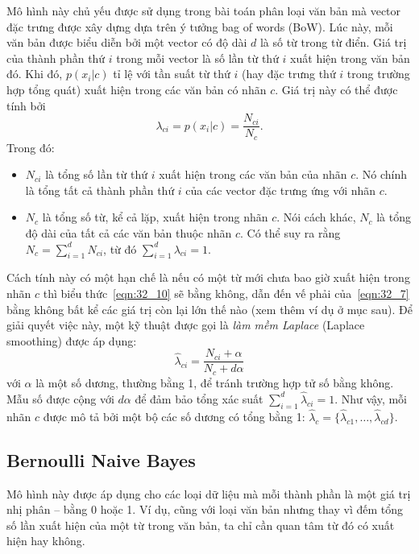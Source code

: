 Mô hình này chủ yếu được sử dụng trong bài toán phân loại văn bản mà vector đặc
trưng được xây dựng dựa trên ý tưởng bag of words (BoW). Lúc này, mỗi văn bản
được biểu diễn bởi một vector có độ dài $d$ là số từ trong từ điển. Giá trị của
thành phần thứ $i$ trong mỗi vector là số lần từ thứ $i$ xuất hiện trong văn bản
đó. Khi đó, $p(x_i |c) $ tỉ lệ với tần suất từ thứ $i$ (hay đặc trưng thứ $i$
trong trường hợp tổng quát) xuất hiện trong các văn bản có nhãn $c$. Giá trị này
có thể được tính bởi
\begin{equation}
\label{eqn:32_10}
\lambda_{ci} = p(x_i | c) = \frac{N_{ci}}{N_c}.
\end{equation}
Trong đó:
\begin{itemize}
\item $N_{ci}$ là tổng số lần từ thứ $i$ xuất hiện trong các văn bản của
nhãn $c$. Nó chính là tổng tất cả thành phần thứ $i$ của các
vector đặc trưng ứng với nhãn $c$.

\item $N_c$ là tổng số từ, kể cả lặp, xuất hiện trong nhãn $c$. Nói cách
khác, $N_c$ là tổng độ dài của tất cả các văn bản thuộc nhãn $c$. Có
thể suy ra rằng $N_c = \sum_{i = 1}^d N_{ci}$, từ đó $\sum_{i=1}^d
\lambda_{ci} = 1$.
\end{itemize}

Cách tính này có một hạn chế là nếu có một từ mới chưa bao giờ xuất hiện trong
nhãn $c$ thì biểu thức~\eqref{eqn:32_10} sẽ bằng không, dẫn đến vế phải
của~\eqref{eqn:32_7} bằng không bất kể các giá trị còn lại lớn thế nào (xem
thêm ví dụ ở mục sau). Để giải quyết việc này, một kỹ thuật được gọi là
\textit{làm mềm Laplace} (Laplace smoothing) được áp dụng:
\begin{equation}
\label{eqn:32_11}
\hat{\lambda}_{ci} = \frac{N_{ci} + \alpha}{N_{c} + d\alpha}
\end{equation}
với $\alpha$ là một số dương, thường bằng 1, để tránh trường hợp tử số bằng
không. Mẫu số được cộng với $d\alpha$ để đảm bảo tổng xác suất $\sum_{i=1}^d
\hat{\lambda}_{ci} = 1$.
Như vậy, mỗi nhãn $c$ được mô tả bởi một bộ các số dương có tổng bằng 1: $\hat{\lambda}_c = \{\hat{\lambda}_{c1}, \dots, \hat{\lambda}_{cd}\}$.


\subsection{Bernoulli Naive Bayes }

Mô hình này được áp dụng cho các loại dữ liệu mà mỗi thành phần là một giá trị
nhị phân -- bằng 0 hoặc 1. Ví dụ, cũng với loại văn bản nhưng thay vì đếm tổng
số lần xuất hiện của một từ trong văn bản, ta chỉ cần quan tâm từ đó có xuất
hiện hay không.

